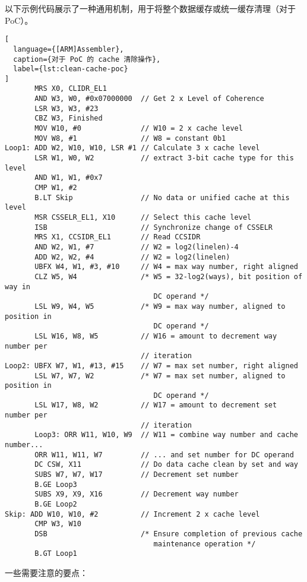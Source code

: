 以下示例代码展示了一种通用机制，用于将整个数据缓存或统一缓存清理（对于 PoC）。

\begin{lstlisting}[
  language={[ARM]Assembler},
  caption={对于 PoC 的 cache 清除操作},
  label={lst:clean-cache-poc}
]
       MRS X0, CLIDR_EL1
       AND W3, W0, #0x07000000  // Get 2 x Level of Coherence
       LSR W3, W3, #23
       CBZ W3, Finished
       MOV W10, #0              // W10 = 2 x cache level
       MOV W8, #1               // W8 = constant 0b1
Loop1: ADD W2, W10, W10, LSR #1 // Calculate 3 x cache level
       LSR W1, W0, W2           // extract 3-bit cache type for this level
       AND W1, W1, #0x7
       CMP W1, #2
       B.LT Skip                // No data or unified cache at this level
       MSR CSSELR_EL1, X10      // Select this cache level
       ISB                      // Synchronize change of CSSELR
       MRS X1, CCSIDR_EL1       // Read CCSIDR
       AND W2, W1, #7           // W2 = log2(linelen)-4
       ADD W2, W2, #4           // W2 = log2(linelen)
       UBFX W4, W1, #3, #10     // W4 = max way number, right aligned
       CLZ W5, W4               /* W5 = 32-log2(ways), bit position of way in
                                   DC operand */
       LSL W9, W4, W5           /* W9 = max way number, aligned to position in
                                   DC operand */
       LSL W16, W8, W5          // W16 = amount to decrement way number per
                                // iteration
Loop2: UBFX W7, W1, #13, #15    // W7 = max set number, right aligned
       LSL W7, W7, W2           /* W7 = max set number, aligned to position in
                                   DC operand */
       LSL W17, W8, W2          // W17 = amount to decrement set number per
                                // iteration
       Loop3: ORR W11, W10, W9  // W11 = combine way number and cache number...
       ORR W11, W11, W7         // ... and set number for DC operand
       DC CSW, X11              // Do data cache clean by set and way
       SUBS W7, W7, W17         // Decrement set number
       B.GE Loop3
       SUBS X9, X9, X16         // Decrement way number
       B.GE Loop2
Skip: ADD W10, W10, #2          // Increment 2 x cache level
       CMP W3, W10
       DSB                      /* Ensure completion of previous cache
                                   maintenance operation */
       B.GT Loop1
\end{lstlisting}

一些需要注意的要点：

